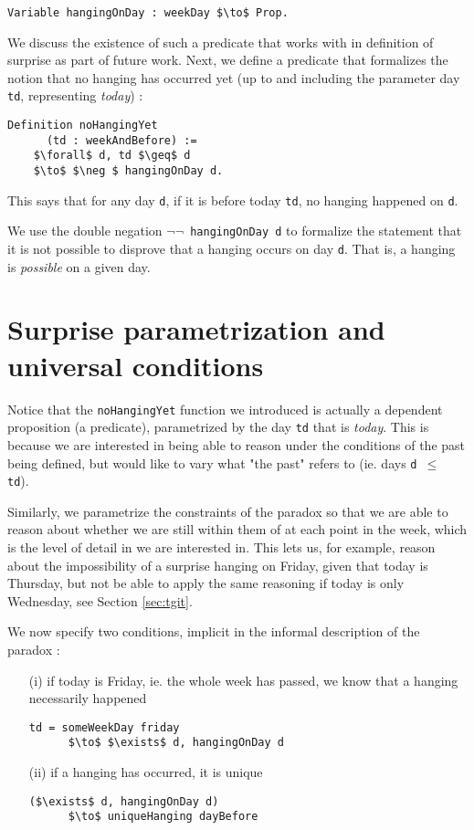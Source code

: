 \documentclass[journal]{journal}
\begin{document}
\begin{lstlisting}[mathescape=true]
  Variable hangingOnDay : weekDay $\to$ Prop.
\end{lstlisting}

We discuss the existence of such a predicate that
works with in definition of surprise as part of future work.
Next, we define a predicate that formalizes the notion that no hanging has occurred
yet (up to and including the parameter day {\tt td}, representing \emph{today}) :

\begin{lstlisting}[mathescape=true]
  Definition noHangingYet
      (td : weekAndBefore) :=
    $\forall$ d, td $\geq$ d
    $\to$ $\neg $ hangingOnDay d.
\end{lstlisting}

This says that for any day {\tt d}, if it is before today {\tt td}, no hanging
happened on {\tt d}.

We use the double negation {\tt $\neg \neg$ hangingOnDay d} to formalize the statement that it is
not possible to disprove that a hanging occurs on day {\tt d}. That is, a hanging
is \emph{possible} on a given day.

\section{Surprise parametrization and universal conditions}
\label{sec:universal}

Notice that the {\tt noHangingYet} function we introduced is actually a
dependent proposition (a predicate), parametrized by
the day {\tt td} that is \emph{today}. This is because we are interested in
being able to reason under the conditions of the past being defined, but
would like to vary what "the past" refers to (ie. days {\tt d $\leq$ td}).

Similarly, we parametrize the
constraints of the paradox so that we are able to reason about
whether we are still within them of at each point in the week,
which is the level of detail in we are interested in. This lets us, for example,
reason about the impossibility of a surprise hanging on Friday, given that
today is Thursday, but not be able to apply the same reasoning if
today is only Wednesday, see Section \ref{sec:tgit}.

We now specify two conditions, implicit in the informal
description of the paradox :

\begin{itemize}
  \item[(i)] if today is Friday, ie. the whole
  week has passed, we know that a hanging necessarily happened
  \begin{lstlisting}[mathescape=true]
    td = someWeekDay friday
      $\to$ $\exists$ d, hangingOnDay d
  \end{lstlisting}
  \item[(ii)] if a hanging has occurred, it is unique
  \begin{lstlisting}[mathescape=true]
    ($\exists$ d, hangingOnDay d)
      $\to$ uniqueHanging dayBefore
  \end{lstlisting}
\end{itemize}
\end{document}
